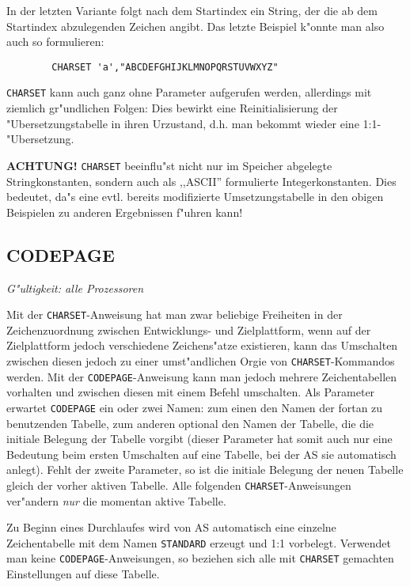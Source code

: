 \documentclass[12pt,a4paper,twoside]{report}
\makeatletter
\newcommand{\bb}[1]{{\bf #1}}
\newcommand{\tty}[1]{{\tt #1}}
\newcommand{\ttindex}[1]{\index{#1@{\tt #1}}}
\makeatother
\begin{document}
In der letzten Variante folgt nach dem Startindex ein String, der die ab
dem Startindex abzulegenden Zeichen angibt.  Das letzte Beispiel k"onnte
man also auch so formulieren:
\begin{verbatim}
        CHARSET 'a',"ABCDEFGHIJKLMNOPQRSTUVWXYZ"
\end{verbatim}

\tty{CHARSET} kann auch ganz ohne Parameter aufgerufen werden, allerdings
mit ziemlich gr"undlichen Folgen: Dies bewirkt eine Reinitialisierung der
"Ubersetzungstabelle in ihren Urzustand, d.h. man bekommt wieder eine
1:1-"Ubersetzung.

\bb{ACHTUNG!} \tty{CHARSET} beeinflu"st nicht nur im Speicher abgelegte
Stringkonstanten, sondern auch als ,,ASCII'' formulierte Integerkonstanten.
Dies bedeutet, da"s eine evtl. bereits modifizierte Umsetzungstabelle
in den obigen Beispielen zu anderen Ergebnissen f"uhren kann!


\subsection{CODEPAGE}
\ttindex{CODEPAGE}

{\em G"ultigkeit: alle Prozessoren}

Mit der \tty{CHARSET}-Anweisung hat man zwar beliebige Freiheiten in der
Zeichenzuordnung zwischen Entwicklungs- und Zielplattform, wenn auf der
Zielplattform jedoch verschiedene Zeichens"atze existieren, kann das
Umschalten zwischen diesen jedoch zu einer umst"andlichen Orgie von
\tty{CHARSET}-Kommandos werden.  Mit der \tty{CODEPAGE}-Anweisung kann
man jedoch mehrere Zeichentabellen vorhalten und zwischen diesen mit einem
Befehl umschalten.  Als Parameter erwartet \tty{CODEPAGE} ein oder zwei
Namen: zum einen den Namen der fortan zu benutzenden Tabelle, zum anderen
optional den Namen der Tabelle, die die initiale Belegung der Tabelle
vorgibt (dieser Parameter hat somit auch nur eine Bedeutung beim ersten
Umschalten auf eine Tabelle, bei der AS sie automatisch anlegt).  Fehlt
der zweite Parameter, so ist die initiale Belegung der neuen Tabelle
gleich der vorher aktiven Tabelle.  Alle folgenden
\tty{CHARSET}-Anweisungen ver"andern {\em nur} die momentan aktive Tabelle.

Zu Beginn eines Durchlaufes wird von AS automatisch eine einzelne
Zeichentabelle mit dem Namen \tty{STANDARD} erzeugt und 1:1 vorbelegt.
Verwendet man keine \tty{CODEPAGE}-Anweisungen, so beziehen sich alle mit
\tty{CHARSET} gemachten Einstellungen auf diese Tabelle.
\end{document}
